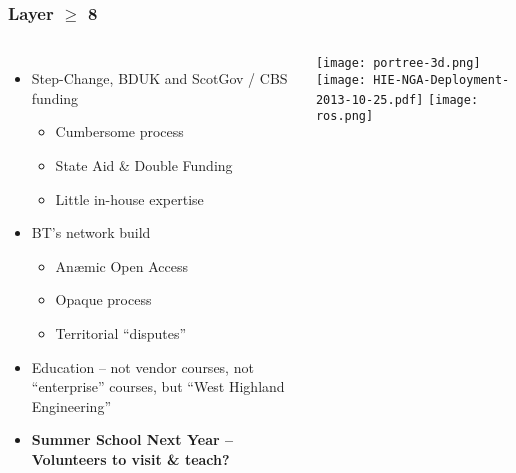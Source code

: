 \documentclass{beamer}
\begin{document}
\begin{frame}
  \frametitle{Layer $\geq$ 8}
  \begin{columns}
    \begin{itemize}
      \item Step-Change, BDUK and ScotGov / CBS funding
        \begin{itemize}
          \item Cumbersome process
          \item State Aid \& Double Funding
          \item Little in-house expertise
        \end{itemize}
      \item BT's network build
        \begin{itemize}
          \item An\ae{}mic Open Access
          \item Opaque process
          \item Territorial ``disputes''
        \end{itemize}
      \item Education -- not vendor courses, not ``enterprise''
        courses, but ``West Highland Engineering''
      \item \textbf{\color{hubsblue} Summer School Next Year --
        Volunteers to visit \& teach?}
    \end{itemize}
    \hspace{-2em}\texttt{[image: portree-3d.png]}\\
    \hspace{-2em}\texttt{[image: HIE-NGA-Deployment-2013-10-25.pdf]}
    \texttt{[image: ros.png]}
  \end{columns}
\end{frame}
\begin{frame}
  \begin{center}
  \end{center}
\end{frame}    
\end{document}
